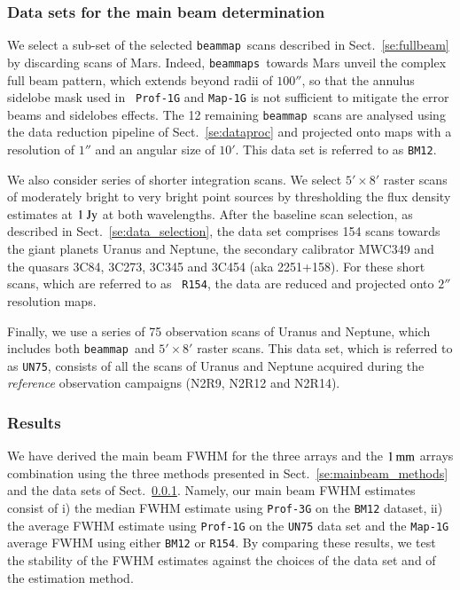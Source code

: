 \documentclass[traditionalabstract]{aa}
\newcommand{\bm}{{\tt beammap}}
\newcommand{\bms}{{\tt beammaps}}
\newcommand{\lp}[1]{#1}
\begin{document}
\subsubsection{Data sets for the main beam determination}
\label{se:mainbeam_dataset}

We select a sub-set of the selected \bm\ scans described in
Sect.~\ref{se:fullbeam} by discarding scans of Mars. {\lp Indeed, \bms\
towards Mars unveil the complex full beam pattern, which extends beyond
radii of $100''$, so that the annulus sidelobe mask used in {\tt
Prof-1G} and {\tt Map-1G} is not sufficient to mitigate the error
beams and sidelobes effects.}
The 12 remaining \bm\ scans are analysed using the data reduction
pipeline of Sect.~\ref{se:dataproc} and projected onto maps
with a resolution of $1''$ and an angular size of $10'$. This data set
is referred to as {\tt BM12}.

We also consider series of shorter integration scans. We select
$5' \times 8'$ raster scans of moderately bright to very bright point
sources by thresholding the flux density estimates at $1~\rm{Jy}$ at both
wavelengths.
After the baseline scan selection, as described in
Sect.~\ref{se:data_selection}, the data set comprises 154 %
scans towards the giant planets Uranus and Neptune, the secondary calibrator
MWC349 and the quasars 3C84, 3C273, 3C345 and 3C454 (aka
2251+158). For these short scans, which are referred to as {\tt
R154}, the data are reduced and projected onto $2''$
resolution maps. 

{\lp Finally, we use a series of 75 observation scans of Uranus and
Neptune, which includes both \bm\ and $5' \times 8'$ raster scans. 
This data set, which is referred to as {\tt UN75}, consists of all the
scans of Uranus and Neptune acquired during the \emph{reference}
observation campaigns (N2R9, N2R12 and N2R14).}


\subsubsection{Results}
\label{se:mainbeam_results}

We have derived the main beam FWHM for the three arrays and the
$1\,\rm{mm}$ arrays combination using the three methods presented in
Sect.~\ref{se:mainbeam_methods} and the data
sets of Sect.~\ref{se:mainbeam_dataset}.
Namely, our main beam FWHM estimates
consist of i) the median FWHM estimate using {\tt Prof-3G} on the
{\tt BM12} dataset, ii) the average FWHM estimate using {\tt Prof-1G}
on the {\tt UN75} data set and the {\tt Map-1G} average FWHM using
either {\tt BM12} or {\tt R154}. 
By comparing these results, we test the stability of the FWHM
estimates against the choices of the data set and of the estimation
method. 
\end{document}

